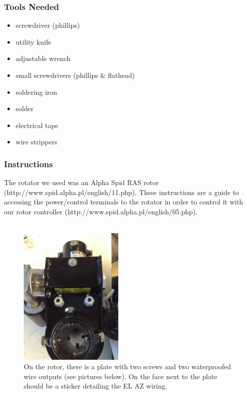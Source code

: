 \documentclass[11pt]{article} %
\begin{document}
\subsubsection{Tools Needed}
\begin{multicols}{2}
\begin{itemize}
\item screwdriver (phillips)
\item utility knife
\item adjustable wrench 
\item small screwdrivers (phillips \& flathead) 
\item soldering iron
\item solder 
\item electrical tape 
\item wire strippers 
\end{itemize}
\end{multicols}

\subsubsection{Instructions}


The rotator we used was an Alpha Spid RAS rotor (http://www.spid.alpha.pl/english/11.php). These instructions are a guide to accessing the power/control terminals to the rotator in order to control it with our rotor controller (http://www.spid.alpha.pl/english/05.php). \\ \\


\begin{figure}
  \centering
  \caption{On the rotor, there is a plate with two screws and two waterproofed wire outputs (see pictures below). On the face next to the plate should be a sticker detailing the EL AZ wiring. }
  \includegraphics[width=0.45\textwidth]{wiring/01.jpeg}
\end{figure}
\end{document}
